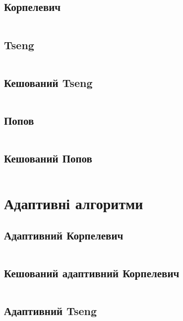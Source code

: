\subsection{Корпелевич}
\inputminted[linenos,firstline=09,lastline=40,fontsize=\footnotesize]{python}{src/core/korpelevich.py}

\newpage\subsection{Tseng}
\inputminted[linenos,firstline=09,lastline=41,fontsize=\footnotesize]{python}{src/core/tseng.py}

\newpage\subsection{Кешований Tseng}
\inputminted[linenos,firstline=44,lastline=77,fontsize=\footnotesize]{python}{src/core/tseng.py}

\newpage\subsection{Попов}
\inputminted[linenos,firstline=09,lastline=42,fontsize=\footnotesize]{python}{src/core/popov.py}

\newpage\subsection{Кешований Попов}
\inputminted[linenos,firstline=45,lastline=81,fontsize=\footnotesize]{python}{src/core/popov.py}

\section{Адаптивні алгоритми}

\subsection{Адаптивний Корпелевич}
\inputminted[linenos,firstline=8,lastline=54,fontsize=\tiny]{python}{src/adaptive/korpelevich.py}

\newpage
\subsection{Кешований адаптивний Корпелевич}
\inputminted[linenos,firstline=57,fontsize=\tiny]{python}{src/adaptive/korpelevich.py}

\newpage
\subsection{Адаптивний Tseng}
\inputminted[linenos,firstline=8,lastline=53,fontsize=\tiny]{python}{src/adaptive/tseng.py}

